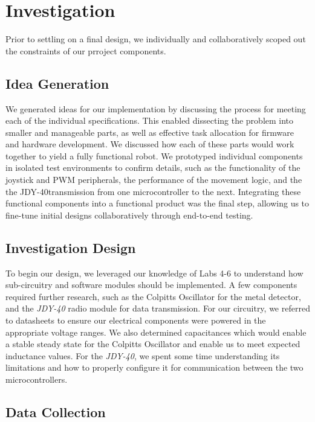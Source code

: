 \documentclass{article}
\begin{document}
\section{Investigation}

Prior to settling on a final design, we individually and collaboratively scoped out the constraints of our prroject components.

\subsection{Idea Generation}

We generated ideas for our implementation by discussing the process for meeting each of the individual specifications.
This enabled dissecting the problem into smaller and manageable parts, as well as effective task allocation for firmware and
hardware development. We discussed how each of these parts would work together to yield a fully functional robot. We prototyped individual components
in isolated test environments to confirm details, such as the functionality of the joystick and PWM peripherals, the performance of the movement logic,
and the the JDY-40transmission from one microcontroller to the next. Integrating these functional components into a functional product was the
final step, allowing us to fine-tune initial designs collaboratively through end-to-end testing.

\subsection{Investigation Design}

To begin our design, we leveraged our knowledge of Labs 4-6 to understand how sub-circuitry and software modules should be implemented. A few components required further research, such as the Colpitts Oscillator for the metal detector, and the \textit{JDY-40} radio module for data transmission.
For our circuitry, we referred to datasheets to ensure our electrical components were powered in the appropriate voltage ranges.
We also determined capacitances which would enable a stable steady state for the Colpitts Oscillator and enable us to meet expected inductance values.
For the \textit{JDY-40}, we spent some time understanding its limitations and how to properly configure it for communication between the two microcontrollers.

\subsection{Data Collection}
\end{document}
